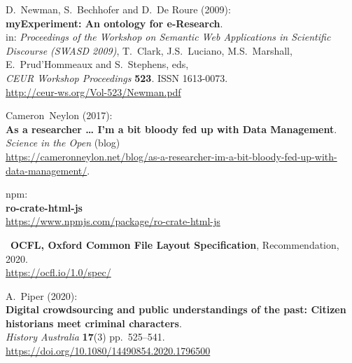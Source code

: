 \begin{thebibliography}{9}
D.~Newman, S.~Bechhofer and D.~De Roure (2009):\\
\textbf{myExperiment: An ontology for e-Research}.\\
in: \emph{Proceedings of the Workshop on Semantic Web Applications in
Scientific Discourse (SWASD 2009)}, T.~Clark, J.S.~Luciano,
M.S.~Marshall, E.~Prud'Hommeaux and S.~Stephens, eds,\\
\emph{CEUR Workshop Proceedings} \textbf{523}. ISSN 1613-0073.\\
\url{http://ceur-ws.org/Vol-523/Newman.pdf}

Cameron~Neylon (2017):\\
\textbf{As a researcher \ldots{} I'm a bit bloody fed up with Data
Management}.\\
\emph{Science in the Open} (blog)\\
\url{https://cameronneylon.net/blog/as-a-researcher-im-a-bit-bloody-fed-up-with-data-management/}.

npm:\\
\textbf{ro-crate-html-js}\\
\url{https://www.npmjs.com/package/ro-crate-html-js}

~\textbf{OCFL, Oxford Common File Layout Specification},
Recommendation, 2020.\\
\url{https://ocfl.io/1.0/spec/}

A.~Piper (2020):\\
\textbf{Digital crowdsourcing and public understandings of the past:
Citizen historians meet criminal characters}.\\
\emph{History Australia} \textbf{17}(3) pp.~525--541.\\
\url{https://doi.org/10.1080/14490854.2020.1796500}



\end{thebibliography}
